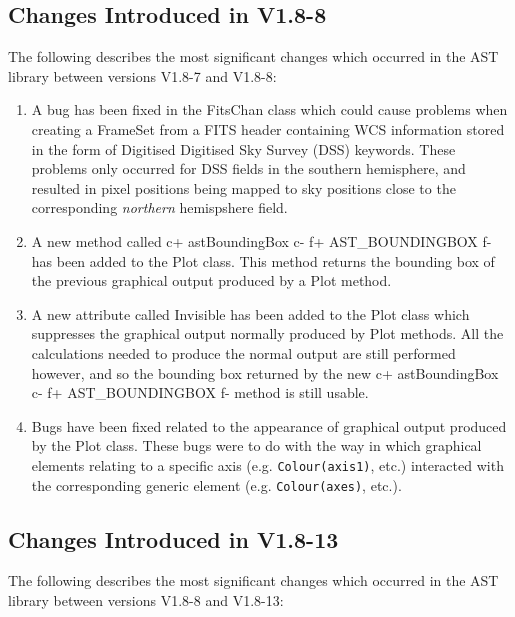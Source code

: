 \documentclass[twoside,11pt]{article}
\begin{document}
\subsection{Changes Introduced in V1.8-8}

The following describes the most significant changes which
occurred in the AST library between versions V1.8-7 and V1.8-8:

\begin{enumerate}

\item A bug has been fixed in the FitsChan class which could cause
problems when creating a FrameSet from a FITS header containing WCS
information stored in the form of Digitised Digitised Sky Survey (DSS)
keywords. These problems only occurred for DSS fields in the southern
hemisphere, and resulted in pixel positions being mapped to sky positions
close to the corresponding {\em northern} hemispshere field.

\item A new method called
c+
astBoundingBox
c-
f+
AST\_BOUNDINGBOX
f-
has been added to the Plot class. This method returns the bounding box of
the previous graphical output produced by a Plot method.

\item A new attribute called Invisible has been added to the Plot class
which suppresses the graphical output normally produced by Plot methods.
All the calculations needed to produce the normal output are still
performed however, and so the bounding box returned by the new
c+
astBoundingBox
c-
f+
AST\_BOUNDINGBOX
f-
method is still usable.

\item Bugs have been fixed related to the appearance of graphical output
produced by the Plot class. These bugs were to do with the way in which
graphical elements relating to a specific axis (e.g. {\tt Colour(axis1)}, etc.)
interacted with the corresponding generic element (e.g.
{\tt Colour(axes)}, etc.).

\end{enumerate}


\subsection{Changes Introduced in V1.8-13}

The following describes the most significant changes which occurred
in the AST library between versions V1.8-8 and V1.8-13:
\end{document}
